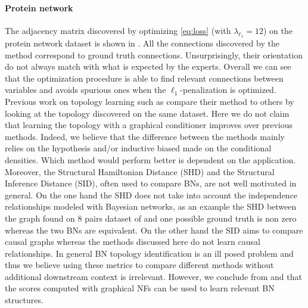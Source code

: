 \paragraph{Protein network}
The adjacency matrix discovered by optimizing \eqref{eq:loss} (with $ \lambda_{\ell_1} = 12$) on the protein network dataset is shown in . All the connections discovered by the method correspond to ground truth connections. Unsurprisingly, their orientation do not always match with what is expected by the experts. Overall we can see that the optimization procedure is able to find relevant connections between variables and avoids spurious ones when the $\ell_1$-penalization is optimized. Previous work on topology learning such as \cite{DAG-1,DAG-2, DAG-3} compare their method to others by looking at the topology discovered on the same dataset. Here we do not claim that learning the topology with a graphical conditioner improves over previous methods. Indeed, we believe that the difference between the methods mainly relies on the hypothesis and/or inductive biased made on the conditional densities. Which method would perform better is dependent on the application. Moreover, the Structural Hamiltonian Distance (SHD) and the Structural Inference Distance (SID), often used to compare BNs, are not well motivated in general. On the one hand the SHD does not take into account the independence relationships modeled with Bayesian networks, as an example the SHD between the graph found on 8 pairs dataset of  and one possible ground truth is non zero whereas the two BNs are equivalent. On the other hand the SID aims to compare causal graphs whereas the methods discussed here do not learn causal relationships. In general BN topology identification is an ill posed problem and thus we believe using these metrics to compare different methods without additional downstream context is irrelevant. However, we conclude from  and  that the scores computed with graphical NFs can be used to learn relevant BN structures.%

